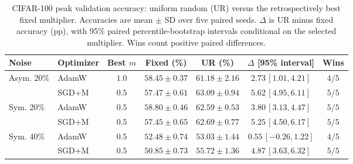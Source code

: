 \begin{table}[H]
\centering
\caption{CIFAR-100 peak validation accuracy: uniform random (UR) versus
the retrospectively best fixed multiplier. Accuracies are mean $\pm$ SD
over five paired seeds. $\Delta$ is UR minus fixed accuracy (pp), with
95\% paired percentile-bootstrap intervals conditional on the selected
multiplier. Wins count positive paired differences.}
\label{tab:cifar-ur-fixed}
\footnotesize
\setlength{\tabcolsep}{2.2pt}
\renewcommand{\arraystretch}{1.08}
\begin{tabular*}{\linewidth}{@{\extracolsep{\fill}}llccccc@{}}
\toprule
Noise & Optimizer & Best $m$ & Fixed (\%) & UR (\%) &
$\Delta$ [95\% interval] & Wins \\
\midrule
\multirow{2}{*}{Asym. 20\%}
& AdamW & $1.0$ & $58.45\pm0.37$ & $61.18\pm2.16$
& $2.73\,[1.01,4.21]$ & $4/5$ \\
& SGD+M & $0.5$ & $57.47\pm0.61$ & $63.09\pm0.94$
& $5.62\,[4.95,6.11]$ & $5/5$ \\
\midrule
\multirow{2}{*}{Sym. 20\%}
& AdamW & $0.5$ & $58.80\pm0.46$ & $62.59\pm0.53$
& $3.80\,[3.13,4.47]$ & $5/5$ \\
& SGD+M & $0.5$ & $57.45\pm0.65$ & $62.69\pm0.77$
& $5.25\,[4.50,6.17]$ & $5/5$ \\
\midrule
\multirow{2}{*}{Sym. 40\%}
& AdamW & $0.5$ & $52.48\pm0.74$ & $53.03\pm1.44$
& $0.55\,[-0.26,1.22]$ & $4/5$ \\
& SGD+M & $0.5$ & $50.85\pm0.73$ & $55.72\pm1.36$
& $4.87\,[3.63,6.32]$ & $5/5$ \\
\bottomrule
\end{tabular*}
\end{table}
